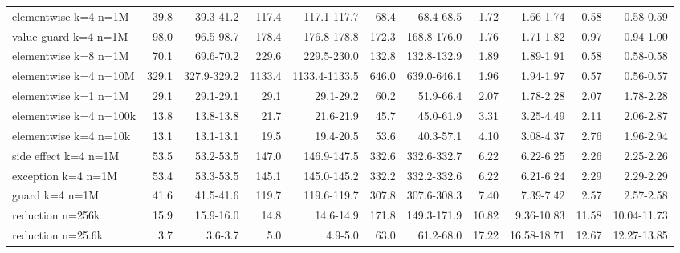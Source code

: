 \begin{tabular}{lrrrrrrrrrr}
elementwise k=4 n=1M & 39.8 & 39.3-41.2 & 117.4 & 117.1-117.7 & 68.4 & 68.4-68.5 & 1.72 & 1.66-1.74 & 0.58 & 0.58-0.59 \\
value guard k=4 n=1M & 98.0 & 96.5-98.7 & 178.4 & 176.8-178.8 & 172.3 & 168.8-176.0 & 1.76 & 1.71-1.82 & 0.97 & 0.94-1.00 \\
elementwise k=8 n=1M & 70.1 & 69.6-70.2 & 229.6 & 229.5-230.0 & 132.8 & 132.8-132.9 & 1.89 & 1.89-1.91 & 0.58 & 0.58-0.58 \\
elementwise k=4 n=10M & 329.1 & 327.9-329.2 & 1133.4 & 1133.4-1133.5 & 646.0 & 639.0-646.1 & 1.96 & 1.94-1.97 & 0.57 & 0.56-0.57 \\
elementwise k=1 n=1M & 29.1 & 29.1-29.1 & 29.1 & 29.1-29.2 & 60.2 & 51.9-66.4 & 2.07 & 1.78-2.28 & 2.07 & 1.78-2.28 \\
elementwise k=4 n=100k & 13.8 & 13.8-13.8 & 21.7 & 21.6-21.9 & 45.7 & 45.0-61.9 & 3.31 & 3.25-4.49 & 2.11 & 2.06-2.87 \\
elementwise k=4 n=10k & 13.1 & 13.1-13.1 & 19.5 & 19.4-20.5 & 53.6 & 40.3-57.1 & 4.10 & 3.08-4.37 & 2.76 & 1.96-2.94 \\
side effect k=4 n=1M & 53.5 & 53.2-53.5 & 147.0 & 146.9-147.5 & 332.6 & 332.6-332.7 & 6.22 & 6.22-6.25 & 2.26 & 2.25-2.26 \\
exception k=4 n=1M & 53.4 & 53.3-53.5 & 145.1 & 145.0-145.2 & 332.2 & 332.2-332.6 & 6.22 & 6.21-6.24 & 2.29 & 2.29-2.29 \\
guard k=4 n=1M & 41.6 & 41.5-41.6 & 119.7 & 119.6-119.7 & 307.8 & 307.6-308.3 & 7.40 & 7.39-7.42 & 2.57 & 2.57-2.58 \\
reduction n=256k & 15.9 & 15.9-16.0 & 14.8 & 14.6-14.9 & 171.8 & 149.3-171.9 & 10.82 & 9.36-10.83 & 11.58 & 10.04-11.73 \\
reduction n=25.6k & 3.7 & 3.6-3.7 & 5.0 & 4.9-5.0 & 63.0 & 61.2-68.0 & 17.22 & 16.58-18.71 & 12.67 & 12.27-13.85 \\
\bottomrule
\end{tabular}
